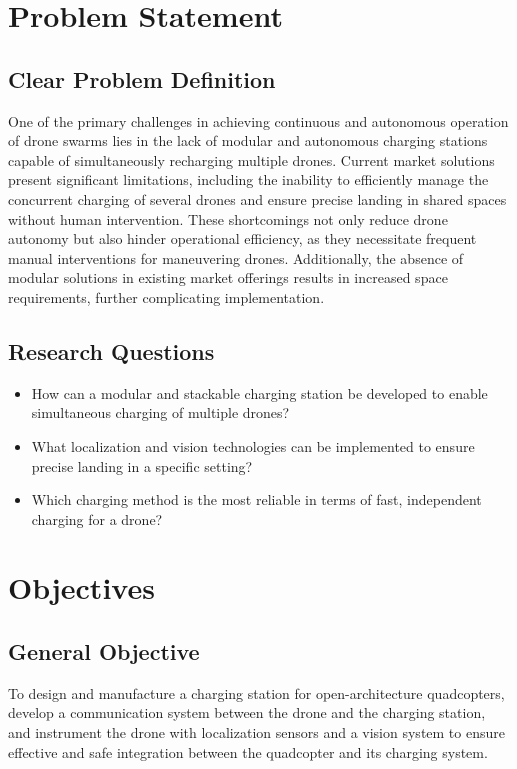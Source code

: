 \section{Problem Statement}

\subsection{Clear Problem Definition}

One of the primary challenges in achieving continuous and autonomous operation of drone swarms lies in the lack of modular and autonomous charging stations capable of simultaneously recharging multiple drones. Current market solutions present significant limitations, including the inability to efficiently manage the concurrent charging of several drones and ensure precise landing in shared spaces without human intervention. These shortcomings not only reduce drone autonomy but also hinder operational efficiency, as they necessitate frequent manual interventions for maneuvering drones. Additionally, the absence of modular solutions in existing market offerings results in increased space requirements, further complicating implementation.

\subsection{Research Questions}

\begin{itemize}
    \item How can a modular and stackable charging station be developed to enable simultaneous charging of multiple drones?
    \item What localization and vision technologies can be implemented to ensure precise landing in a specific setting?
    \item Which charging method is the most reliable in terms of fast, independent charging for a drone?
\end{itemize}

\section{Objectives}

\subsection{General Objective}

To design and manufacture a charging station for open-architecture quadcopters, develop a communication system between the drone and the charging station, and instrument the drone with localization sensors and a vision system to ensure effective and safe integration between the quadcopter and its charging system.

